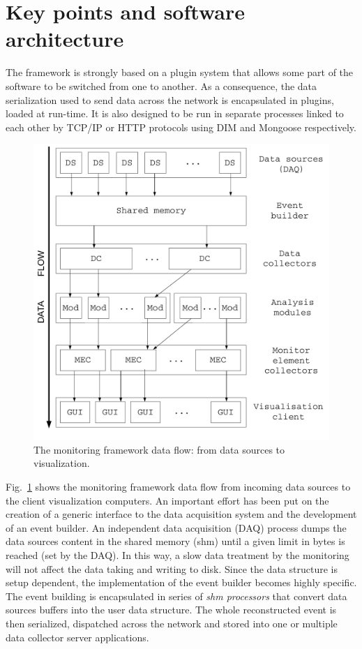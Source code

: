 \documentclass[conference]{IEEEtran}
\begin{document}
\section{Key points and software architecture}

The framework is strongly based on a plugin system that allows some part of the software to be switched from one to another. As a consequence, the data serialization used to send data across the network is encapsulated in plugins, loaded at run-time. It is also designed to be run in separate processes linked to each other by TCP/IP or HTTP protocols using DIM\cite{DIM} and Mongoose\cite{MONGOOSE} respectively. 

\begin{figure}[htbp]
  \includegraphics[width=\linewidth]{DQMWorkflow.pdf}
  \caption{\label{DQM_WORKFLOW}The monitoring framework data flow: from data sources to visualization.}
\end{figure}

Fig.~\ref{DQM_WORKFLOW} shows the monitoring framework data flow from incoming data sources to the client visualization computers. An important effort has been put on the creation of a generic interface to the data acquisition system and the development of an event builder. An independent data acquisition (DAQ) process dumps the data sources content in the shared memory (shm) until a given limit in bytes is reached (set by the DAQ). In this way, a slow data treatment by the monitoring will not affect the data taking and writing to disk. Since the data structure is setup dependent, the implementation of the event builder becomes highly specific. The event building is encapsulated in series of \textit{shm processors} that convert data sources buffers into the user data structure. The whole reconstructed event is then serialized, dispatched across the network and stored into one or multiple data collector server applications.
\end{document}
